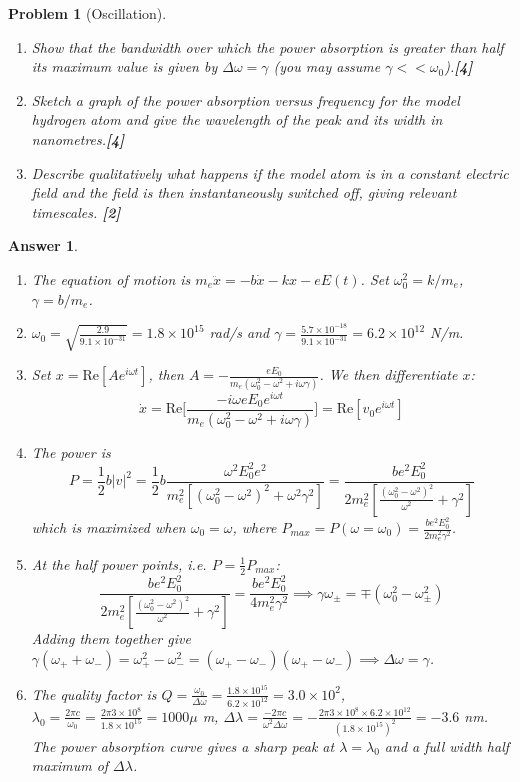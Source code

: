 \documentclass[a4paper]{article}
\newtheorem{ans}{Answer}[subsection]
\theoremstyle{new}
\newtheorem{qns}{Problem}[subsection]
\begin{document}
\begin{qns}[Oscillation]
\begin{enumerate}[label=(\roman*)]
\item Show that the bandwidth over which the power absorption is greater than half its maximum value is given by $\Delta\omega=\gamma$ (you may assume  $\gamma<<\omega_0$).\hfill\textbf{[4]}
\item Sketch a graph of the power absorption versus frequency for the model hydrogen  atom and give the wavelength of the peak and its width in nanometres.\hfill\textbf{[4]}
\item Describe qualitatively what happens if the model atom is in a constant electric field and the field is then instantaneously switched off, giving relevant timescales. \hfill\textbf{[2]}
\end{enumerate}
\end{qns}
\newpage
\begin{ans}\leavevmode
\begin{enumerate}[label=(\roman*)]
\item The equation of motion is $m_e\ddot{x}=-b\dot{x}-kx-eE(t)$. Set $\omega_0^2=k/m_e$, $\gamma=b/m_e$.
\item $\omega_0=\sqrt{\frac{2.9}{9.1\times10^{-31}}}=1.8\times10^{15}$ rad/s and $\gamma=\frac{5.7\times10^{-18}}{9.1\times10^{-31}}=6.2\times10^{12}$ N/m.
\item Set $x=\text{Re}[Ae^{i\omega t}]$, then $A=-\frac{eE_0}{m_e(\omega_0^2-\omega^2+i\omega\gamma)}$. We then differentiate $x$:
$$\dot{x}=\text{Re}\bigg[\frac{-i\omega eE_0e^{i\omega t}}{m_e(\omega_0^2-\omega^2+i\omega\gamma)}\bigg]=\text{Re}[v_0e^{i\omega t}]$$
\item The power is
$$P=\frac{1}{2}b|v|^2=\frac{1}{2}b\frac{\omega^2E_0^2e^2}{m_e^2[(\omega_0^2-\omega^2)^2+\omega^2\gamma^2]}=\frac{be^2E_0^2}{2m_e^2[\frac{(\omega_0^2-\omega^2)^2}{\omega^2}+\gamma^2]}$$
which is maximized when $\omega_0=\omega$, where $P_{max}=P(\omega=\omega_0)=\frac{be^2E_0^2}{2m_e^2\gamma^2}$.
\item At the half power points, i.e. $P=\frac{1}{2}P_{max}$:
$$\frac{be^2E_0^2}{2m_e^2[\frac{(\omega_0^2-\omega^2)^2}{\omega^2}+\gamma^2]}=\frac{be^2E_0^2}{4m_e^2\gamma^2}\implies\gamma\omega_\pm=\mp(\omega_0^2-\omega^2_\pm)$$
Adding them together give $\gamma(\omega_++\omega_-)=\omega_+^2-\omega_-^2=(\omega_+-\omega_-)(\omega_+-\omega_-)\implies\Delta\omega=\gamma$.
\item The quality factor is $Q=\frac{\omega_0}{\Delta\omega}=\frac{1.8\times10^{15}}{6.2\times10^{12}}=3.0\times10^2$, $\lambda_0=\frac{2\pi c}{\omega_0}=\frac{2\pi 3\times10^8}{1.8\times10^{15}}=1000\mu$ m, $\Delta\lambda=\frac{-2\pi c}{\omega^2\Delta\omega}=-\frac{2\pi 3\times10^8\times 6.2\times10^{12}}{(1.8\times10^{15})^2}=-3.6$ nm. The power absorption curve gives a sharp peak at $\lambda=\lambda_0$ and a full width half maximum of $\Delta\lambda$.


\end{enumerate}
\end{ans}
\end{document}
